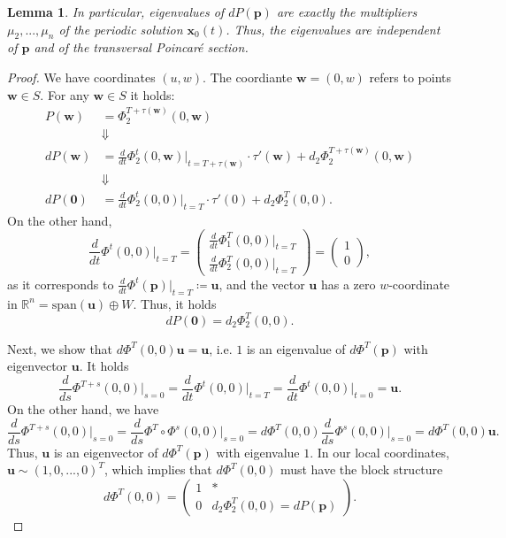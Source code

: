 \documentclass[hidelinks,a4paper, 11pt]{article}
\theoremstyle{plain}
\newtheorem{lemma}[theorem]{Lemma}
\theoremstyle{break}
\theoremstyle{plain}
\theoremstyle{definition}
\begin{document}
{\begin{lemma}
	In particular, eigenvalues of $dP(\mathbf p)$ are exactly the multipliers $\mu_2,...,\mu_n$ of the periodic solution $\mathbf x_0(t)$. Thus, the eigenvalues are independent of $\mathbf p$ and of the transversal Poincaré section.
\end{lemma}

\begin{proof}
	We have coordinates $(u,w)$. The coordiante $\mathbf w = (0,w)$  refers to points $\mathbf w \in S$. For any $\mathbf w \in S$ it holds:
	\begin{align*}
		P(\mathbf w) &= \Phi_2^{T+\tau(\mathbf w)}(0, \mathbf w)  \\
		&\Downarrow \\
		dP(\mathbf w) &= \frac{d}{dt}\Phi_2^t(0, \mathbf w) \Big \vert_{t = T+\tau(\mathbf w)}\cdot \tau'(\mathbf w) + d_2\Phi_2^{T+\tau(\mathbf w)}(0, \mathbf w) \\
		& \Downarrow \\
		dP(\mathbf 0) &= \frac{d}{dt}\Phi_2^t(0,0) \Big \vert_{t=T} \cdot \tau'(0) + d_2  \Phi_2^T(0,0).
	\end{align*}
	On the other hand, $$\frac{d}{dt} \Phi^t(0,0) \Big |_{t = T} = \begin{pmatrix}
		\frac{d}{dt} \Phi_1^T(0,0) \Big |_{t=T} \\
				\frac{d}{dt} \Phi_2^T(0,0) \Big |_{t=T} 
	\end{pmatrix} = \begin{pmatrix}1 \\ 0 \end{pmatrix},$$ as it corresponds to $\frac{d}{dt}\Phi^t(\mathbf p)\Big |_{t=T} \coloneqq \mathbf u$, and the vector $\mathbf u$ has a zero $w$-coordinate in $\mathbb R^n = \mathrm{span}(\mathbf u) \oplus W$. Thus, it holds $$dP(\mathbf 0) = d_2  \Phi_2^T(0,0).$$

	Next, we show that $d\Phi^T(0,0)\mathbf u = \mathbf u$, i.e. $1$ is an eigenvalue of $d\Phi^T(\mathbf p)$ with eigenvector $\mathbf u$. It holds
	\[
		\frac{d}{ds}\Phi^{T+s}(0,0) \Big |_{ s = 0} = \frac{d}{dt} \Phi^t(0,0) \Big |_{t=T} = \frac{d}{dt}\Phi^t(0,0) \Big |_{t=0} = \mathbf u.
	\]
	On the other hand, we have
	\[
		\frac{d}{ds}\Phi^{T+s}(0,0) \Big |_{s=0} = \frac{d}{ds} \Phi^T \circ \Phi^s(0,0) \Big |_{s=0} = d\Phi^T(0,0) \frac{d}{ds}\Phi^s(0,0) \Big |_{s=0} = d\Phi^T(0,0) \mathbf u.
	\]
	Thus, $\mathbf u$ is an eigenvector of $d\Phi^T(\mathbf p)$ with eigenvalue $1$. In our local coordinates, $\mathbf u \sim (1,0,...,0)^T$, which implies that $d\Phi^T(0,0)$ must have the block structure
	\[
		d\Phi^T(0,0) = \begin{pmatrix}
			1 & * \\ 0 & d_2\Phi_2^T(0,0) = dP(\mathbf p)
		\end{pmatrix}.
	\]
\end{proof}


}
\end{document}
